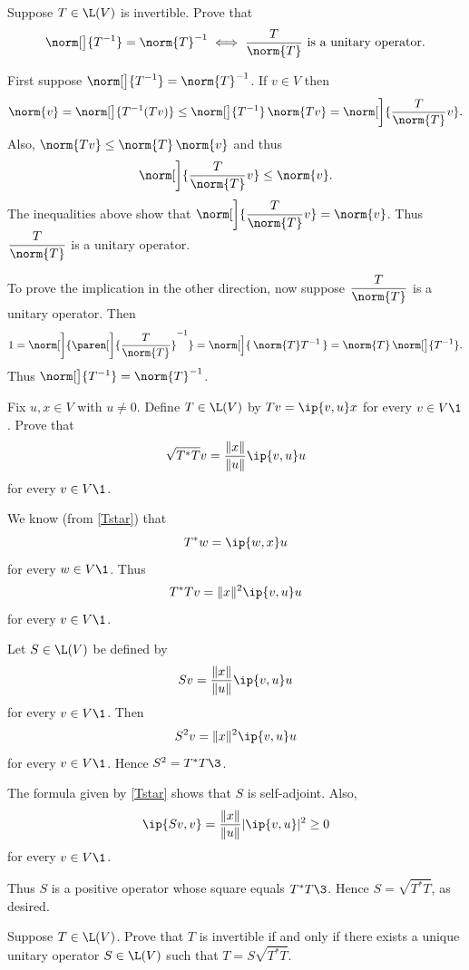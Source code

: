 \exercise
Suppose $T \in \L(V)$ is invertible. Prove that
\vspace{-3bp}
\[
\norm[\big]{ T^{-1} } = \norm{T}^{-1} \iff \frac{T}{\norm{T}} \text{ is a unitary operator}.
\]
\vspace{-16bp}

\begin{Solution}
First suppose $\displaystyle \norm[\big]{ T^{-1} } = \norm{T}^{-1}$. If $v\in V$ then
\[
\norm{v} = \norm[\big]{ T^{-1}(Tv) } \le \norm[\big]{ T^{-1} } \, \norm{Tv} = \norm[\bigg]{ \frac{T}{\norm{T}}  v }.
\]
Also, $\norm{Tv} \le \norm{T} \, \norm{v}$ and thus
\[
\norm[\bigg]{ \frac{T}{\norm{T}}  v } \le \norm{v}.
\]
The inequalities above show that $\displaystyle \norm[\bigg]{ \frac{T}{\norm{T}}  v } = \norm{v}$. Thus $\displaystyle \frac{T}{\norm{T}}$ is a unitary operator.

To prove the implication in the other direction, now suppose $\displaystyle \frac{T}{\norm{T}}$ is a unitary operator. Then
\[
1 = \norm[\bigg]{ \paren[\bigg]{ \frac{T}{\norm{T}} }^{-1} } = \norm[\Big]{\, \norm{T} T^{-1}\, }= \norm{T} \, \norm[\big]{ T^{-1} }.
\]
Thus $\norm[\big]{ T^{-1} } = \norm{T}^{-1}$.
\end{Solution}

\pagebreak[3]

\exercise
Fix $u, x \in V$ with $u \ne 0$. Define $T \in \L(V)$ by
$
Tv = \ip{v, u}x
$
for every $v \in V\1$.  Prove that
\[
\sqrt{T^* T}v = \frac{ \|x\| }{ \|u\| } \ip{v,u} u
\]
for every $v \in V\1$.

\begin{Solution}
We know (from \ref{Tstar}) that
\[
T^* w = \ip{w, x}u
\]
for every $w \in V\1$.  Thus
\[
T^*Tv = \|x\|^2 \ip{v, u} u
\]
for every $v \in V\1$.

Let $S \in \L(V)$ be defined by
\[
Sv = \frac{ \|x\| }{ \|u\| } \ip{v,u} u
\]
for every $v \in V\1$. Then
\[
S^2 v = \|x\|^2 \ip{v, u} u
\]
for every $v \in V\1$. Hence $S^2 = T^*T\3$.

The formula given by \ref{Tstar} shows that $S$ is self-adjoint. Also,
\[
\ip{Sv, v} = \frac{ \|x\| }{ \|u\| } |\ip{v,u}|^2 \ge 0
\]
for every $v \in V\1$.

Thus $S$ is a positive operator whose square equals $T^* T\3$. Hence $S = \sqrt{T^* T}$, as desired.
\end{Solution}

\exercise
Suppose $T \in \L(V)$.  Prove that $T$ is invertible if and only if there exists a
unique unitary operator $S \in \L(V)$ such that $T = S \sqrt{T^* T}$.


